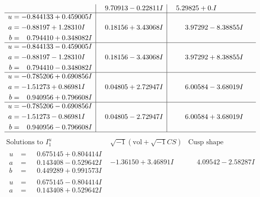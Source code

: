 \documentclass[1p]{elsarticle_modified}
\theoremstyle{definition}
\newcommand{\I}{\sqrt{-1}}
\begin{document}
$$\begin{array}{c|c|c}
 & \phantom{-}9.70913 - 0.22811 I & \phantom{-}5.29825 + 0. I\phantom{ +0.000000I} \\ \hline\begin{aligned}
u &= -0.844133 + 0.459005 I \\
a &= -0.88197 + 1.28310 I \\
b &= \phantom{-}0.794410 + 0.348082 I\end{aligned}
 & \phantom{-}0.18156 + 3.43068 I & \phantom{-}3.97292 - 8.38855 I \\ \hline\begin{aligned}
u &= -0.844133 - 0.459005 I \\
a &= -0.88197 - 1.28310 I \\
b &= \phantom{-}0.794410 - 0.348082 I\end{aligned}
 & \phantom{-}0.18156 - 3.43068 I & \phantom{-}3.97292 + 8.38855 I \\ \hline\begin{aligned}
u &= -0.785206 + 0.690856 I \\
a &= -1.51273 + 0.86981 I \\
b &= \phantom{-}0.940956 + 0.796608 I\end{aligned}
 & \phantom{-}0.04805 + 2.72947 I & \phantom{-}6.00584 - 3.68019 I \\ \hline\begin{aligned}
u &= -0.785206 - 0.690856 I \\
a &= -1.51273 - 0.86981 I \\
b &= \phantom{-}0.940956 - 0.796608 I\end{aligned}
 & \phantom{-}0.04805 - 2.72947 I & \phantom{-}6.00584 + 3.68019 I\\
 \hline 
 \end{array}$$\newpage$$\begin{array}{c|c|c}  
\text{Solutions to }I^u_{1}& \I (\text{vol} + \sqrt{-1}CS) & \text{Cusp shape}\\
 \hline 
\begin{aligned}
u &= \phantom{-}0.675145 + 0.804414 I \\
a &= \phantom{-}0.143408 - 0.529642 I \\
b &= \phantom{-}0.449289 + 0.991573 I\end{aligned}
 & -1.36150 + 3.46891 I & \phantom{-}4.09542 - 2.58287 I \\ \hline\begin{aligned}
u &= \phantom{-}0.675145 - 0.804414 I \\
a &= \phantom{-}0.143408 + 0.529642 I \\

\end{aligned}
\end{array}$$
\end{document}

